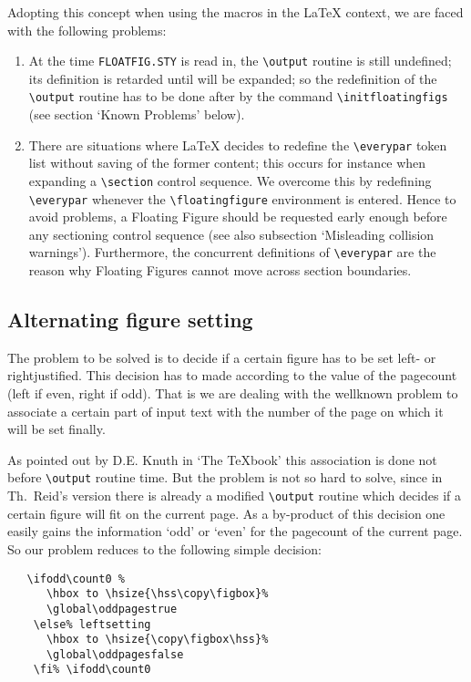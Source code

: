  Adopting this concept when using the macros in the \LaTeX{} context,
 we are faced with the following problems:
 \begin{enumerate}
 \item At the time \hbox{\tt FLOATFIG.STY} is read in, 
       the \verb+\output+ routine is still undefined;
       its definition is retarded until
       \verb++ will be expanded;
       so the redefinition of the \verb+\output+ routine has to be
       done after \verb++
       by the command \verb+\initfloatingfigs+
       (see section `Known Problems' below).
 \item There are situations where
       \LaTeX{} decides to redefine the \verb+\everypar+ token list
       without saving of the former content;
       this occurs for instance when expanding 
       a \verb+\section+ control sequence.
       We overcome this by redefining \verb+\everypar+ whenever
       the \verb+\floatingfigure+ environment is entered.
       Hence to avoid problems, a Floating Figure should be requested
       early enough before any sectioning control sequence
       (see also subsection `Misleading collision warnings').\hfil\break
       Furthermore, the concurrent definitions of
       \verb+\everypar+ are the reason why
       Floating Figures cannot move across section boundaries.
 \end{enumerate}
 \subsection{Alternating figure setting}
 The problem to be solved
 is to decide if a certain figure has to be set 
 left- or rightjustified. 
 This decision has to made according to
 the value of the pagecount (left if even, right if odd).
 That is we are dealing with the wellknown problem 
 to associate a certain part of input text with the number
 of the page on which it will be set finally.
  
 As pointed out by D.E. Knuth in `The {\TeX}book' this association
 is done not before \verb+\output+ routine time.
 But the problem is not so hard to solve, 
 since in Th.~Reid's version there is already a modified 
 \verb+\output+ routine which decides if a certain figure will
 fit on the current page.
 As a by-product of this decision one easily gains
 the information `odd' or `even' for the pagecount
 of the current page.
 So our problem reduces to the following simple decision:
 \begin{verbatim}
   \ifodd\count0 %
      \hbox to \hsize{\hss\copy\figbox}% 
      \global\oddpagestrue
    \else% leftsetting
      \hbox to \hsize{\copy\figbox\hss}%
      \global\oddpagesfalse
    \fi% \ifodd\count0
 \end{verbatim}
